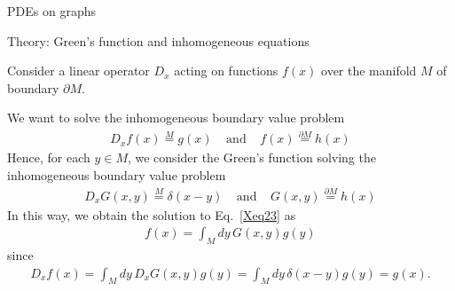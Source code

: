 \documentclass{beamer}
\begin{document}


\begin{frame}{PDEs on graphs}



\end{frame}




\begin{frame}{Theory: Green's function and inhomogeneous equations}

Consider a linear operator $D_x$ acting on functions $f(x)$ over the manifold $M$ of boundary $\partial M$.

We want to solve the inhomogeneous boundary value problem
\begin{eqnarray}
\label{Xeq27}
D_xf(x)
\stackrel{M}{=}
g(x)
\;\;\;\;
\mbox{and}
\;\;\;\;
f(x)
\stackrel{\partial M}{=}
h(x)
\end{eqnarray}
Hence, for each $y\in M$, we consider the Green's function solving the inhomogeneous boundary value problem
\begin{eqnarray}
D_x G(x,y)
\stackrel{M}{=}
\delta(x-y)
\;\;\;\;
\mbox{and}
\;\;\;\;
G(x,y)
\stackrel{\partial M}{=}
h(x)
\end{eqnarray}
In this way, we obtain the solution to Eq.~\ref{Xeq23} as
\begin{eqnarray}
f(x)
=
\int_{M} dy\, 
G(x,y) 
g(y)
\end{eqnarray}
since
\begin{eqnarray}
D_x f(x)
=
\int_M dy\, 
D_x G(x,y) 
g(y)
=
\int_M dy\, 
\delta(x-y)
g(y)
=
g(x)
.
\end{eqnarray}

\end{frame}

\end{document}
